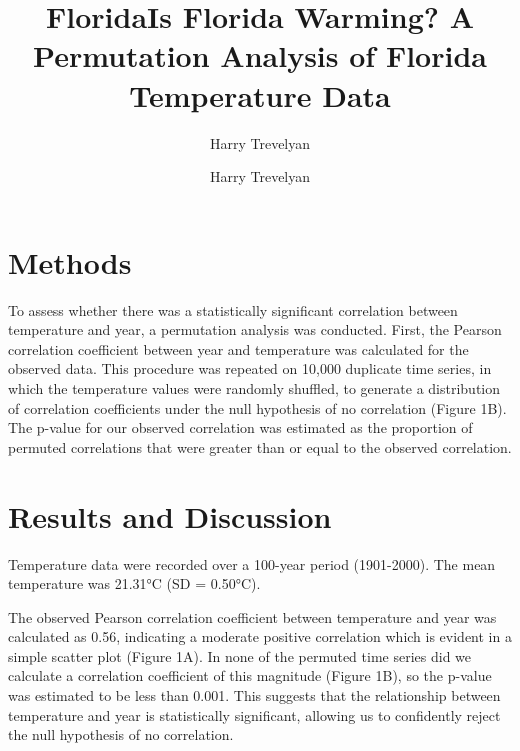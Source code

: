 \documentclass{article}
\title{Florida}
\author{Harry Trevelyan}
\date{}
\title{Is Florida Warming? A Permutation Analysis of Florida Temperature Data}
\author{Harry Trevelyan}
\date{} %
\begin{document}
\maketitle

\section*{Methods}
To assess whether there was a statistically significant correlation between temperature and year, a permutation analysis was conducted. First, the Pearson correlation coefficient between year and temperature was calculated for the observed data. This procedure was repeated on 10,000 duplicate time series, in which the temperature values were randomly shuffled, to generate a distribution of correlation coefficients under the null hypothesis of no correlation (Figure 1B). The p-value for our observed correlation was estimated as the proportion of permuted correlations that were greater than or equal to the observed correlation.

\section*{Results and Discussion}
Temperature data were recorded over a 100-year period (1901-2000). The mean temperature was 21.31°C (SD = 0.50°C). 

The observed Pearson correlation coefficient between temperature and year was calculated as 0.56, indicating a moderate positive correlation which is evident in a simple scatter plot (Figure 1A). In none of the permuted time series did we calculate a correlation coefficient of this magnitude (Figure 1B), so the p-value was estimated to be less than 0.001. This suggests that the relationship between temperature and year is statistically significant, allowing us to confidently reject the null hypothesis of no correlation.
\end{document}
